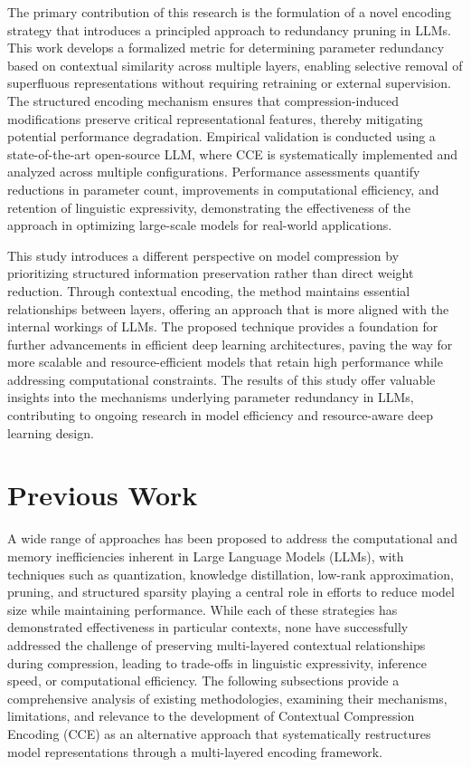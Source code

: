 \documentclass{article}
\begin{document}
The primary contribution of this research is the formulation of a novel encoding strategy that introduces a principled approach to redundancy pruning in LLMs. This work develops a formalized metric for determining parameter redundancy based on contextual similarity across multiple layers, enabling selective removal of superfluous representations without requiring retraining or external supervision. The structured encoding mechanism ensures that compression-induced modifications preserve critical representational features, thereby mitigating potential performance degradation. Empirical validation is conducted using a state-of-the-art open-source LLM, where CCE is systematically implemented and analyzed across multiple configurations. Performance assessments quantify reductions in parameter count, improvements in computational efficiency, and retention of linguistic expressivity, demonstrating the effectiveness of the approach in optimizing large-scale models for real-world applications.

This study introduces a different perspective on model compression by prioritizing structured information preservation rather than direct weight reduction. Through contextual encoding, the method maintains essential relationships between layers, offering an approach that is more aligned with the internal workings of LLMs. The proposed technique provides a foundation for further advancements in efficient deep learning architectures, paving the way for more scalable and resource-efficient models that retain high performance while addressing computational constraints. The results of this study offer valuable insights into the mechanisms underlying parameter redundancy in LLMs, contributing to ongoing research in model efficiency and resource-aware deep learning design.




\section{Previous Work}

A wide range of approaches has been proposed to address the computational and memory inefficiencies inherent in Large Language Models (LLMs), with techniques such as quantization, knowledge distillation, low-rank approximation, pruning, and structured sparsity playing a central role in efforts to reduce model size while maintaining performance. While each of these strategies has demonstrated effectiveness in particular contexts, none have successfully addressed the challenge of preserving multi-layered contextual relationships during compression, leading to trade-offs in linguistic expressivity, inference speed, or computational efficiency. The following subsections provide a comprehensive analysis of existing methodologies, examining their mechanisms, limitations, and relevance to the development of Contextual Compression Encoding (CCE) as an alternative approach that systematically restructures model representations through a multi-layered encoding framework. 
\end{document}
